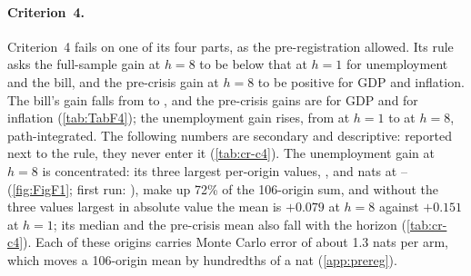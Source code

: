 \paragraph{Criterion~4.}
Criterion~4 fails on one of its four parts, as the pre-registration allowed. %
Its rule asks the full-sample gain at $h = 8$ to be below that at $h = 1$ for unemployment and the
bill, and the pre-crisis gain at $h = 8$ to be positive for GDP and inflation. The bill's gain falls
from  to
, and the pre-crisis gains are
 for GDP and
 for inflation (\cref{tab:TabF4});
the unemployment gain rises, from  at $h = 1$
to  at $h = 8$, path-integrated. %
The following numbers are secondary and descriptive: reported next to the rule, they never enter it
(\cref{tab:cr-c4}). %
The unemployment gain at $h = 8$ is concentrated: its three largest per-origin values,
,
 and
 nats at
--
(\cref{fig:FigF1}; first run: ), make up 72\% of the 106-origin sum,
and without the three values largest in absolute value the mean is $+0.079$ at $h = 8$ against
$+0.151$ at $h = 1$; its median and the pre-crisis mean also fall with the horizon
(\cref{tab:cr-c4}). Each of these origins carries Monte Carlo error of about 1.3 nats per arm,
which moves a 106-origin mean by hundredths of a nat (\cref{app:prereg}).
